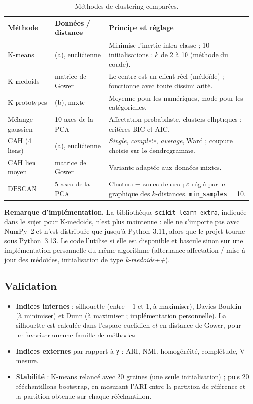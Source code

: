\documentclass[11pt,a4paper]{article}
\begin{document}
\begin{table}[H]\centering\small
\caption{Méthodes de clustering comparées.}\label{tab:methodes}
\begin{tabularx}{\textwidth}{|L{2.9cm}|L{3.3cm}|Y|}
\hline
\textbf{Méthode} & \textbf{Données / distance} & \textbf{Principe et réglage}\\ \hline
K-means & (a), euclidienne & Minimise l'inertie intra-classe ; 10 initialisations ; $k$ de 2 à 10 (méthode du coude).\\ \hline
K-medoids & matrice de Gower & Le centre est un client réel (médoïde) ; fonctionne avec toute dissimilarité.\\ \hline
K-prototypes & (b), mixte & Moyenne pour les numériques, mode pour les catégorielles.\\ \hline
Mélange gaussien & 10 axes de la PCA & Affectation probabiliste, clusters elliptiques ; critères BIC et AIC.\\ \hline
CAH (4 liens) & (a), euclidienne & \emph{Single}, \emph{complete}, \emph{average}, Ward ; coupure choisie sur le dendrogramme.\\ \hline
CAH lien moyen & matrice de Gower & Variante adaptée aux données mixtes.\\ \hline
DBSCAN & 5 axes de la PCA & Clusters = zones denses ; $\varepsilon$ réglé par le graphique des $k$-distances, \texttt{min\_samples} = 10.\\ \hline
\end{tabularx}
\end{table}

\textbf{Remarque d'implémentation.} La bibliothèque \texttt{scikit-learn-extra}, indiquée dans le sujet pour K-medoids, n'est plus maintenue : elle ne s'importe pas avec NumPy~2 et n'est distribuée que jusqu'à Python~3.11, alors que le projet tourne sous Python~3.13. Le code l'utilise si elle est disponible et bascule sinon sur une implémentation personnelle du même algorithme (alternance affectation / mise à jour des médoïdes, initialisation de type \emph{k-medoids++}).

\subsection{Validation}
\begin{itemize}
\item \textbf{Indices internes} : silhouette (entre $-1$ et 1, à maximiser), Davies-Bouldin (à minimiser) et Dunn (à maximiser ; implémentation personnelle). La silhouette est calculée dans l'espace euclidien \emph{et} en distance de Gower, pour ne favoriser aucune famille de méthodes.
\item \textbf{Indices externes} par rapport à \texttt{y} : ARI, NMI, homogénéité, complétude, V-mesure.
\item \textbf{Stabilité} : K-means relancé avec 20 graines (une seule initialisation) ; puis 20 rééchantillons bootstrap, en mesurant l'ARI entre la partition de référence et la partition obtenue sur chaque rééchantillon.
\end{itemize}
\end{document}
